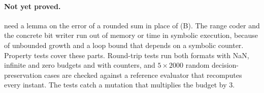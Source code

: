 \paragraph{Not yet proved.}  need a lemma on the
error of a rounded sum in place of (B). The range coder and the concrete
bit writer run out of memory or time in symbolic execution, because of
unbounded  growth and a loop bound that depends on a symbolic
counter. Property tests cover these parts. Round-trip tests run both
formats with NaN, infinite and zero budgets and with counters, and
$5 \times 2000$ random decision-preservation cases are checked against a
reference evaluator that recomputes every instant. The tests catch a
mutation that multiplies the budget by 3.
